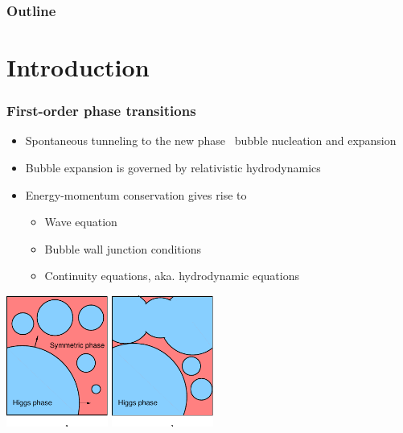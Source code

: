 \begin{frame}
    \titlepage
\end{frame}

\begin{frame}
    \frametitle{Outline}
    \tableofcontents
\end{frame}

\section{Introduction}

\begin{frame}
    \frametitle{First-order phase transitions}
    \begin{minipage}[t]{0.48\linewidth}
        \begin{itemize}
            \item Spontaneous tunneling to the new phase \textrightarrow \ bubble nucleation and expansion
            \item Bubble expansion is governed by relativistic hydrodynamics
            \item Energy-momentum conservation gives rise to
            \begin{itemize}
                \item Wave equation
                \item Bubble wall junction conditions
                \item Continuity equations, aka. hydrodynamic equations
            \end{itemize}
        \end{itemize}
    \end{minipage}%
    \hfill%
    \begin{minipage}[t]{0.48\linewidth}
        \includegraphics[width=0.25\textwidth]{../fig/HiggsBubble1.pdf}%
        \includegraphics[width=0.25\textwidth]{../fig/HiggsBubble2.pdf}%

\end{minipage}
\end{frame}
